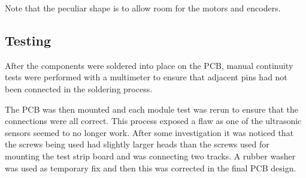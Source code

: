 Note that the peculiar shape is to allow room for the motors and encoders. 

\subsection{Testing}\label{elec/pcb/test}

After the components were soldered into place on the PCB, manual continuity tests were performed with a multimeter to ensure that adjacent pins had not been connected in the soldering process.

The PCB was then mounted and each module test was rerun to ensure that the connections were all correct. This process exposed a flaw as one of the ultrasonic sensors seemed to no longer work. After some investigation it was noticed that the screws being used had slightly larger heads than the screws used for mounting the test strip board and was connecting two tracks. A rubber washer was used as temporary fix and then this was corrected in the final PCB design. 
